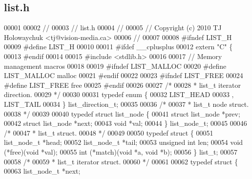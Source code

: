 \subsection{list.\+h}
\label{list_8h_source}

\begin{DoxyCode}
00001 
00002 \textcolor{comment}{//}
00003 \textcolor{comment}{// list.h}
00004 \textcolor{comment}{//}
00005 \textcolor{comment}{// Copyright (c) 2010 TJ Holowaychuk <tj@vision-media.ca>}
00006 \textcolor{comment}{//}
00007 
00008 \textcolor{preprocessor}{#ifndef LIST\_H}
00009 \textcolor{preprocessor}{#define LIST\_H}
00010 
00011 \textcolor{preprocessor}{#ifdef \_\_cplusplus}
00012 \textcolor{keyword}{extern} \textcolor{stringliteral}{"C"} \{
00013 \textcolor{preprocessor}{#endif}
00014 
00015 \textcolor{preprocessor}{#include <stdlib.h>}
00016 
00017 \textcolor{comment}{// Memory management macros}
00018 
00019 \textcolor{preprocessor}{#ifndef LIST\_MALLOC}
00020 \textcolor{preprocessor}{#define LIST\_MALLOC malloc}
00021 \textcolor{preprocessor}{#endif}
00022 
00023 \textcolor{preprocessor}{#ifndef LIST\_FREE}
00024 \textcolor{preprocessor}{#define LIST\_FREE free}
00025 \textcolor{preprocessor}{#endif}
00026 
00027 \textcolor{comment}{/*}
00028 \textcolor{comment}{ * list\_t iterator direction.}
00029 \textcolor{comment}{ */}
00030 
00031 \textcolor{keyword}{typedef} \textcolor{keyword}{enum} \{
00032     LIST_HEAD
00033   , LIST_TAIL
00034 \} list_direction_t;
00035 
00036 \textcolor{comment}{/*}
00037 \textcolor{comment}{ * list\_t node struct.}
00038 \textcolor{comment}{ */}
00039 
00040 \textcolor{keyword}{typedef} \textcolor{keyword}{struct }list_node \{
00041   \textcolor{keyword}{struct }list_node *prev;
00042   \textcolor{keyword}{struct }list_node *next;
00043   \textcolor{keywordtype}{void} *val;
00044 \} list_node_t;
00045 
00046 \textcolor{comment}{/*}
00047 \textcolor{comment}{ * list\_t struct.}
00048 \textcolor{comment}{ */}
00049 
00050 \textcolor{keyword}{typedef} \textcolor{keyword}{struct }\{
00051   list_node_t *head;
00052   list_node_t *tail;
00053   \textcolor{keywordtype}{unsigned} \textcolor{keywordtype}{int} len;
00054   void (*free)(\textcolor{keywordtype}{void} *val);
00055   int (*match)(\textcolor{keywordtype}{void} *a, \textcolor{keywordtype}{void} *b);
00056 \} list_t;
00057 
00058 \textcolor{comment}{/*}
00059 \textcolor{comment}{ * list\_t iterator struct.}
00060 \textcolor{comment}{ */}
00061 
00062 \textcolor{keyword}{typedef} \textcolor{keyword}{struct }\{
00063   list_node_t *next;

\end{DoxyCode}
